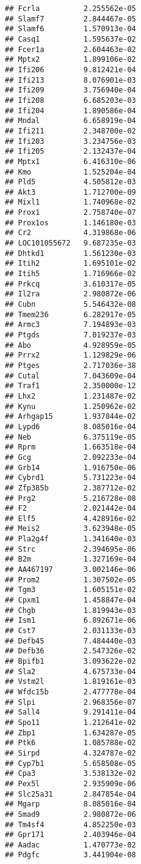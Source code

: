 \documentclass[
]{article}
\begin{document}
\begin{verbatim}
## Fcrla          2.255562e-05
## Slamf7         2.844467e-05
## Slamf6         1.570913e-04
## Casq1          1.595637e-02
## Fcer1a         2.604463e-02
## Mptx2          1.899106e-02
## Ifi206         9.812421e-04
## Ifi213         8.076901e-03
## Ifi209         3.756940e-04
## Ifi208         6.685203e-03
## Ifi204         1.890586e-04
## Mndal          6.658919e-04
## Ifi211         2.348700e-02
## Ifi203         3.234756e-03
## Ifi205         2.132437e-04
## Mptx1          6.416310e-06
## Kmo            1.525204e-04
## Pld5           4.505812e-03
## Akt3           1.712700e-09
## Mixl1          1.740968e-02
## Prox1          2.758740e-07
## Prox1os        1.146180e-03
## Cr2            4.319868e-06
## LOC101055672   9.687235e-03
## Dhtkd1         1.561230e-03
## Itih2          1.695101e-02
## Itih5          1.716966e-02
## Prkcq          3.610317e-05
## Il2ra          2.980872e-06
## Cubn           5.546432e-08
## Tmem236        6.282917e-05
## Armc3          7.194893e-03
## Ptgds          7.019237e-03
## Abo            4.928959e-05
## Prrx2          1.129829e-06
## Ptges          2.717036e-38
## Cutal          7.043609e-04
## Traf1          2.350000e-12
## Lhx2           1.231487e-02
## Kynu           1.250962e-02
## Arhgap15       1.937844e-02
## Lypd6          8.085016e-04
## Neb            6.375119e-05
## Rprm           1.663518e-04
## Gcg            2.092233e-04
## Grb14          1.916750e-06
## Cybrd1         5.731223e-04
## Zfp385b        2.387712e-02
## Prg2           5.216728e-08
## F2             2.021442e-04
## Elf5           4.428916e-02
## Meis2          3.623948e-05
## Pla2g4f        1.341640e-03
## Strc           2.394695e-06
## B2m            1.327169e-04
## AA467197       3.002146e-06
## Prom2          1.307502e-05
## Tgm3           1.605151e-02
## Cpxm1          1.458847e-04
## Chgb           1.819943e-03
## Ism1           6.892671e-06
## Cst7           2.031133e-03
## Defb45         7.484440e-03
## Defb36         2.547326e-02
## Bpifb1         3.093622e-02
## Sla2           4.675733e-04
## Vstm2l         1.819161e-03
## Wfdc15b        2.477778e-04
## Slpi           2.968356e-07
## Sall4          9.291411e-04
## Spo11          1.212641e-02
## Zbp1           1.634287e-05
## Ptk6           1.085788e-02
## Sirpd          4.324787e-02
## Cyp7b1         5.658508e-05
## Cpa3           3.538132e-02
## Pex5l          2.935909e-06
## Slc25a31       2.847854e-04
## Mgarp          8.085016e-04
## Smad9          2.980872e-06
## Tm4sf4         4.852250e-03
## Gpr171         2.403946e-04
## Aadac          1.470773e-02
## Pdgfc          3.441904e-08

\end{verbatim}
\end{document}
